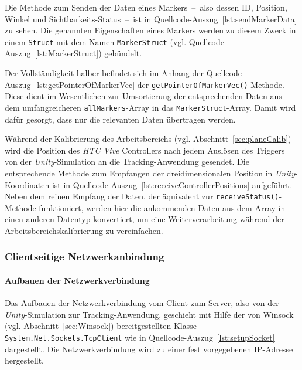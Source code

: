 Die Methode zum Senden der Daten eines Markers~--~also dessen ID, Position, Winkel und Sichtbarkeits-Status~--~ist in Quellcode-Auszug~\ref{lst:sendMarkerData} zu sehen. Die genannten Eigenschaften eines Markers werden zu diesem Zweck in einem \texttt{Struct} mit dem Namen \texttt{Marker\-Struct} (vgl. Quellcode-Auszug~\ref{lst:MarkerStruct}) gebündelt. 

 

Der Vollständigkeit halber befindet sich im Anhang der Quellcode-Auszug~\ref{lst:getPointerOfMarkerVec} der \texttt{get\-Pointer\-Of\-Marker\-Vec()}-Methode. Diese dient im Wesentlichen zur Umsortierung der entsprechenden Daten aus dem umfangreicheren \texttt{allMarkers}-Array in das \texttt{Marker\-Struct}-Array. Damit wird dafür gesorgt, dass nur die relevanten Daten übertragen werden. 

 

Während der Kalibrierung des Arbeitsbereichs (vgl. Abschnitt~\ref{sec:planeCalib}) wird die Position des \emph{HTC Vive} Controllers nach jedem Auslösen des Triggers von der \textit{Unity}-Simulation an die Tracking-Anwendung gesendet. Die entsprechende Methode zum Empfangen der dreidimensionalen Position in \emph{Unity}-Koordinaten ist in Quellcode-Auszug~\ref{lst:receiveControllerPositions} aufgeführt. Neben dem reinen Empfang der Daten, der äquivalent zur \texttt{receive\-Status()}-Methode funktioniert, werden hier die ankommenden Daten aus dem Array in einen anderen Datentyp konvertiert, um eine Weiterverarbeitung während der Arbeitsbereichskalibrierung zu vereinfachen. 






\subsubsection{Clientseitige Netzwerkanbindung}
\paragraph{Aufbauen der Netzwerkverbindung}
Das Aufbauen der Netzwerkverbindung vom Client zum Server, also von der \textit{Unity}-Simulation zur Tracking-Anwendung, geschieht mit Hilfe der von Winsock (vgl. Abschnitt~\ref{sec:Winsock}) bereitgestellten Klasse \texttt{System.Net.Sockets.TcpClient} wie in Quellcode-Auszug~\ref{lst:setupSocket} dargestellt. Die Netzwerkverbindung wird zu einer fest vorgegebenen IP-Adresse hergestellt.

